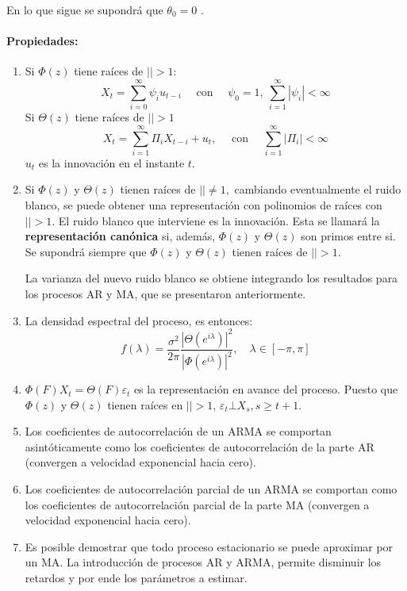 En lo que sigue se supondr\'{a} que $\theta_{0} =0$ .

\paragraph{Propiedades:}
\begin{enumerate}
\item Si $\Phi (z)$ tiene ra\'{i}ces de $\left| \right|> 1$:
\[
 X_{t} =\sum_{i=0}^\infty {\psi_{i} u_{t-i} }\quad\text{ con }\quad \psi_{0} =1,\ \sum_{i=1}^\infty {\left| {\psi_{i} } \right|<\infty } 
\]
Si $\Theta (z)$ tiene ra\'{i}ces de $\left| \right|>1$
\[
X_{t}=\sum_{i=1}^\infty {{\Pi }_{i}X_{t-i}} +u_{t}, \quad\text{ con }\quad \sum_{i=1}^\infty \left| {\Pi }_{i} 
\right| {<\infty  }
\]
$u_{{t}}$ es la innovaci\'{o}n en el instante $t$.

\item Si $\Phi (z)$ y $\Theta (z)$ tienen ra\'{i}ces de $\left| \right|\ne 1,$ cambiando eventualmente el ruido blanco, se puede obtener una representaci\'{o}n con polinomios de ra\'{i}ces con $\left| \right|>1$. El ruido blanco que interviene es la innovaci\'{o}n. Esta se llamar\'{a} la \textbf{representaci\'{o}n can\'{o}nica} si, adem\'{a}s, $\Phi (z)$ y $\Theta (z)$ son primos entre si. Se supondr\'{a} siempre que $\Phi (z)$ y $\Theta (z)$ tienen ra\'{i}ces de $\left| \right|>1$.\newline

La varianza del nuevo ruido blanco se obtiene integrando los resultados para los procesos AR y MA, que se presentaron anteriormente.

\item La densidad espectral del proceso, es entonces:
\[
f\left( \lambda \right)=\frac{\sigma^{2}}{2\pi }\frac{\left| {\Theta (e^{i\lambda })} \right|^{2}}{\left| {\Phi (e^{i\lambda })} \right|^{2}}, \quad \lambda \in \left[ {-\pi ,\pi } \right]
\]

\item $\Phi (F)X_{t} =\Theta (F)\varepsilon_{t} $ es la representaci\'{o}n en avance del proceso. Puesto que $\Phi (z)$ y $\Theta (z)$ tienen ra\'{i}ces en $\left| \right|>1$, $\varepsilon_{t} \bot X_{s} ,s\ge t+1$.

\item Los coeficientes de autocorrelaci\'{o}n de un ARMA se comportan asint\'{o}ticamente como los coeficientes de autocorrelaci\'{o}n de la parte AR (convergen a velocidad exponencial hacia cero).

\item Los coeficientes de autocorrelaci\'{o}n parcial de un ARMA se comportan como los coeficientes de autocorrelaci\'{o}n parcial de la parte MA (convergen a velocidad exponencial hacia cero).

\item Es posible demostrar que todo proceso estacionario se puede aproximar por un MA. La introducci\'{o}n de procesos AR y ARMA, permite disminuir los retardos y por ende los par\'{a}metros a estimar.
\end{enumerate}

